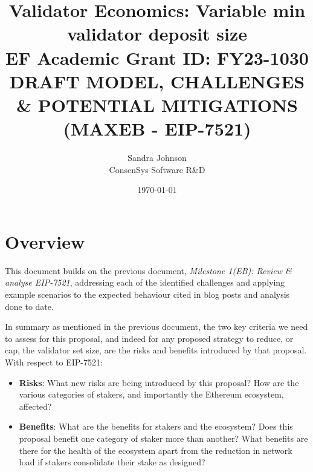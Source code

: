 \documentclass[UTF8]{article}
\title{Validator Economics: Variable min validator deposit size\\
\vspace{4pt}
\large EF Academic Grant ID: FY23-1030\\
\vspace{16pt}
DRAFT MODEL, CHALLENGES \& POTENTIAL MITIGATIONS\\
(MAXEB - EIP-7521) }
\author{Sandra Johnson\\
ConsenSys Software R\&D}
\date{\today}                                           %
\begin{document}
\maketitle



\section{Overview}
This document builds on the previous document, \textit{Milestone 1(EB): Review \& analyse EIP-7521}, addressing each of the identified challenges and applying example scenarios to the expected behaviour cited in blog posts and analysis done to date.

In summary as mentioned in the previous document, the two key criteria we need to assess for this proposal, and indeed for any proposed strategy to reduce, or cap, the validator set size, are the risks and benefits introduced by that proposal. \\

\noindent
With respect to EIP-7521:
\begin{itemize}
\item \textbf{Risks}: What new risks are being introduced by this proposal? How are the various categories of stakers, and importantly the Ethereum ecosystem, affected?
\item  \textbf{Benefits}: What are the benefits for stakers and the ecosystem? Does this proposal benefit one category of staker more than another? What benefits are there for the health of the ecosystem apart from the reduction in network load if stakers consolidate their stake as designed?
\end{itemize}
\end{document}
